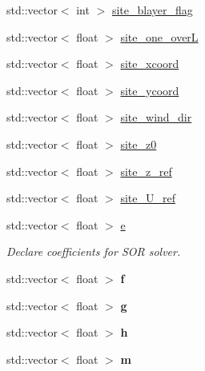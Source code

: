 \begin{DoxyCompactItemize}
\item 
std\+::vector$<$ int $>$ \hyperlink{classSolver_ad28319be4f9915bec3840aadd083c2ae}{site\+\_\+blayer\+\_\+flag}
\item 
std\+::vector$<$ float $>$ \hyperlink{classSolver_ad5f6e755ca6e125ae1499afe1930dfcf}{site\+\_\+one\+\_\+overL}
\item 
std\+::vector$<$ float $>$ \hyperlink{classSolver_a431d4f3051f3c29aabccb5e539e91f4d}{site\+\_\+xcoord}
\item 
std\+::vector$<$ float $>$ \hyperlink{classSolver_a00a819ad1ff7e520b23488a25f43d729}{site\+\_\+ycoord}
\item 
std\+::vector$<$ float $>$ \hyperlink{classSolver_a8c9d9b52656069625d10ba854680f118}{site\+\_\+wind\+\_\+dir}
\item 
std\+::vector$<$ float $>$ \hyperlink{classSolver_a7ca18ea25f9117d2c43f7ea7cf1569e6}{site\+\_\+z0}
\item 
std\+::vector$<$ float $>$ \hyperlink{classSolver_a838b82880aa58582918678eb7b969938}{site\+\_\+z\+\_\+ref}
\item 
std\+::vector$<$ float $>$ \hyperlink{classSolver_adae403dd4db1cf42265cfd74f3ff9452}{site\+\_\+\+U\+\_\+ref}
\item 
\mbox{\label{classSolver_ab65a76ec3befd44f11e817fdef8f47a6}} 
std\+::vector$<$ float $>$ \hyperlink{classSolver_ab65a76ec3befd44f11e817fdef8f47a6}{e}
\begin{DoxyCompactList}\small\item\em Declare coefficients for S\+OR solver. \end{DoxyCompactList}\item 
\mbox{\label{classSolver_ab54b33f50a45b825f4539384f35f61d9}} 
std\+::vector$<$ float $>$ {\bfseries f}
\item 
\mbox{\label{classSolver_a26c3952745b8244e167a6b92e7a4a3c3}} 
std\+::vector$<$ float $>$ {\bfseries g}
\item 
\mbox{\label{classSolver_a17a3e816297c81a3d4a7af3820884774}} 
std\+::vector$<$ float $>$ {\bfseries h}
\item 
\mbox{\label{classSolver_ae5e24f7a9bdda4c664244cb11316feef}} 
std\+::vector$<$ float $>$ {\bfseries m}
\item 
\mbox{\label{classSolver_a53c23907e08c2ccdffbd9001b16a72e2}} 

\end{DoxyCompactItemize}
